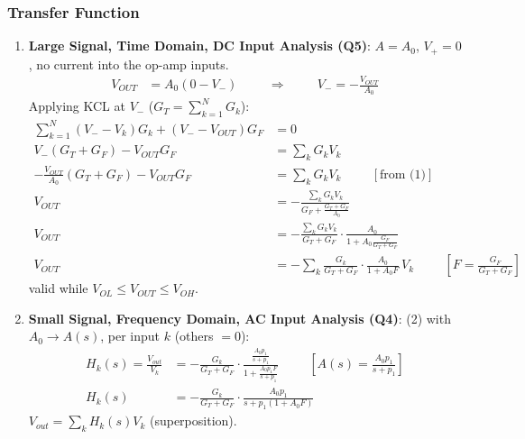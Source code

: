 \subsubsection{Transfer Function}
\begin{enumerate}
  \item \textbf{Large Signal, Time Domain, DC Input Analysis (Q5)}: \(A = A_0\), \(V_+ = 0\),
    no current into the op-amp inputs.
    \begin{align*}
      V_{OUT} &= A_0(0 - V_-) \hspace{1cm} \Rightarrow \hspace{1cm} V_- = -\frac{V_{OUT}}{A_0} \tag{1}
    \end{align*}
    Applying KCL at \(V_-\) (\(G_T = \sum_{k=1}^{N} G_k\)):
    \begin{align*}
      \sum_{k=1}^{N} (V_- - V_k) G_k + (V_- - V_{OUT}) G_F &= 0 \\
      V_-(G_T + G_F) - V_{OUT} G_F &= \sum_{k} G_k V_k \\
      -\frac{V_{OUT}}{A_0}(G_T + G_F) - V_{OUT} G_F &= \sum_{k} G_k V_k \hspace{1cm} [\text{from (1)}] \\
      V_{OUT} &= -\frac{\sum_{k} G_k V_k}{G_F + \frac{G_T + G_F}{A_0}} \\
      V_{OUT} &= -\frac{\sum_{k} G_k V_k}{G_T + G_F}\cdot\frac{A_0}{1 + A_0\frac{G_F}{G_T + G_F}} \\
      V_{OUT} &= -\sum_{k} \frac{G_k}{G_T + G_F}\cdot\frac{A_0}{1 + A_0 F}\, V_k \hspace{1cm} \left[F = \tfrac{G_F}{G_T + G_F}\right] \tag{2}
    \end{align*}
    valid while \(V_{OL} \leq V_{OUT} \leq V_{OH}\).
  \item \textbf{Small Signal, Frequency Domain, AC Input Analysis (Q4)}: (2) with
    \(A_0 \to A(s)\), per input \(k\) (others \(= 0\)):
    \begin{align*}
      H_k(s) = \frac{V_{out}}{V_k} &= -\frac{G_k}{G_T + G_F}\cdot\frac{\frac{A_0 p_1}{s + p_1}}{1 + \frac{A_0 p_1 F}{s + p_1}} \hspace{1cm} \left[A(s) = \tfrac{A_0 p_1}{s + p_1}\right] \\
      H_k(s) &= -\frac{G_k}{G_T + G_F}\cdot\frac{A_0 p_1}{s + p_1(1 + A_0 F)} \tag{3}
    \end{align*}
    \(V_{out} = \sum_k H_k(s) V_k\) (superposition).
\end{enumerate}

